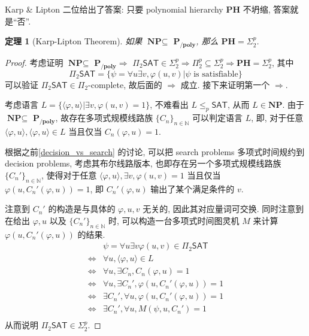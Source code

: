 \documentclass[8pt]{article}
\theoremstyle{compact}
\newtheorem{theorem}{定理}[section]
\def\le{\leqslant}
\def\NP{\textbf{NP}}
\def\PH{\textbf{PH}}
\def\PPOLY{$\textbf{P}_{\textbf{/poly}}$}
\begin{document}
Karp \& Lipton 二位给出了答案: 只要 polynomial hierarchy $\PH$ 不坍缩, 答案就是“否”.
\begin{theorem}[Karp-Lipton Theorem]
	如果 $\NP \subseteq $ \PPOLY, 那么 $\PH = \Sigma_2^p$.
\end{theorem}
\begin{proof}
	考虑证明 $\NP \subseteq$ \PPOLY $\Rightarrow$ $\Pi_2\textsf{SAT} \in \Sigma_2^p \Rightarrow \Pi_2^p \subseteq \Sigma_2^p \Rightarrow \PH = \Sigma_2^p$, 其中 $$\Pi_2\textsf{SAT} = \{\psi = \forall u\exists v, \varphi(u, v) | \psi \text{ is satisfiable}\}$$ 可以验证 $\Pi_2\textsf{SAT} \in \Pi_2$-complete, 故后面的 $\Rightarrow$ 成立. 接下来证明第一个 $\Rightarrow$.

	考虑语言 $L = \{\langle \varphi, u \rangle | \exists v, \varphi(u, v) = 1\}$, 不难看出 $L \le_p \textsf{SAT}$, 从而 $L \in \NP$. 由于 $\NP \subseteq $ \PPOLY, 故存在多项式规模线路族 $\{C_n\}_{n \in \mathbb N}$ 可以判定语言 $L$, 即, 对于任意 $\langle \varphi, u \rangle, \langle \varphi, u \rangle \in L$ 当且仅当 $C_{n}(\varphi, u) = 1$.

	根据之前\cref{decision_vs_search} 的讨论, 可以把 search problems 多项式时间规约到 decision problems, 考虑其布尔线路版本, 也即存在另一个多项式规模线路族 $\{C_n'\}_{n \in \mathbb N}$, 使得对于任意 $\langle \varphi, u \rangle, \exists v, \varphi(u, v) = 1$ 当且仅当 $\varphi(u, C_{n}'(\varphi, u)) = 1$, 即 $C_{n}'(\varphi, u)$ 输出了某个满足条件的 $v$.

	注意到 $C_n'$ 的构造是与具体的 $\varphi, u, v$ 无关的, 因此其对应量词可交换. 同时注意到在给出 $\varphi, u$ 以及 $\{C_n'\}_{n \in \mathbb N}$ 时, 可以构造一台多项式时间图灵机 $M$ 来计算 $\varphi(u, C_{n}'(\varphi, u))$ 的结果.
	\begin{equation*}
		\begin{split}
			& \psi = \forall u \exists v \varphi(u, v) \in \Pi_2\textsf{SAT}\\
			\Leftrightarrow & \forall u, \langle \varphi, u \rangle \in L\\
			\Leftrightarrow & \forall u, \exists C_n, C_n(\varphi, u) = 1\\
			\Leftrightarrow & \forall u, \exists C_n', \varphi(u, C_{n}'(\varphi, u)) = 1\\
			\Leftrightarrow & \exists C_n', \forall u, \varphi(u, C_{n}'(\varphi, u)) = 1\\
			\Leftrightarrow & \exists C_n', \forall u, M(\psi, u, C_n') = 1\\
		\end{split}
	\end{equation*}
	从而说明 $\Pi_2\textsf{SAT} \in \Sigma_2^p$. 
\end{proof}
\end{document}
